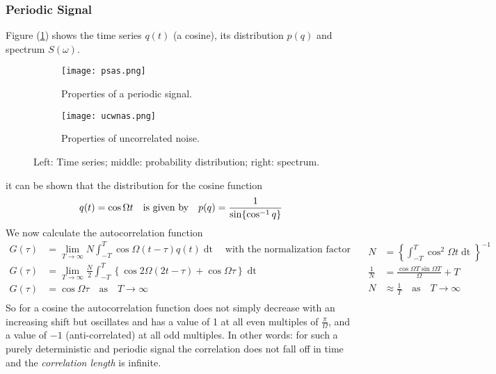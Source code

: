 \subsubsection{Periodic Signal}
Figure (\ref{fig:psas}) shows the time series $q(t)$ (a cosine), its distribution $p(q)$ and spectrum $S(\omega)$.
\begin{figure}[H]
	\centering
	\begin{subfigure}{0.45\linewidth}
		\centering
		\texttt{[image: psas.png]}
		\caption{Properties of a periodic signal.}
		\label{fig:psas}
	\end{subfigure}
	\vline
	\begin{subfigure}{0.45\linewidth}
		\centering
		\texttt{[image: ucwnas.png]}
		\caption{Properties of uncorrelated noise.}
		\label{fig:ucwnas}
	\end{subfigure}
	\caption{Left: Time series; middle: probability distribution; right: spectrum.}
\end{figure}
it can be shown that the distribution for the cosine function
\begin{equation}
	q(t)=\cos\Omega t\quad\text{is given by}\quad p(q)=\frac{1}{\sin\{\cos^{-1} q\}}
\end{equation}
We now calculate the autocorrelation function
\begin{equation}
	\begin{aligned}
		G(\tau)&=\lim_{T\rightarrow\infty}N\int_{-T}^T \cos\Omega(t-\tau)q(t)\mathop{dt}\quad\text{with the normalization factor}\quad\\
		G(\tau)&=\lim_{T\rightarrow\infty}\frac{N}{2}\int_{-T}^T\left\{\cos2\Omega(2t-\tau)+\cos\Omega\tau\right\}\mathop{dt}\\
		G(\tau)&=\cos\Omega \tau\quad\text{as}\quad T\rightarrow\infty\\
	\end{aligned}
	\begin{aligned}
		N&=\left\{\int_{-T}^T\cos^2\Omega t\mathop{dt}\right\}^{-1}\\
		\frac{1}{N}&=\frac{\cos\Omega T\sin\Omega T}{\Omega}+T\\
		N&\approx\frac{1}{T}\quad\text{as}\quad T\rightarrow\infty\\
	\end{aligned}
\end{equation}
So for a cosine the autocorrelation function does not simply decrease with an increasing shift but oscillates and has a value of 1 at all even multiples of $\frac{\pi}{\Omega}$, and a value of $-1$ (anti-correlated) at all odd multiples.
	In other words: for such a purely deterministic and periodic signal the correlation does not fall off in time and the \emph{correlation length} is infinite.

